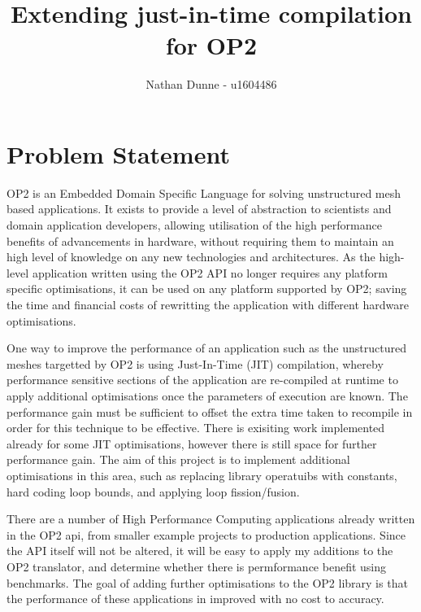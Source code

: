 \documentclass[11pt]{article}
\title{Extending just-in-time compilation for OP2}
\author{Nathan Dunne - u1604486}
\begin{document}
\maketitle
\section*{Problem Statement}
OP2 is an Embedded Domain Specific Language for solving unstructured mesh based applications. It exists to provide a level of abstraction to scientists and domain application developers, allowing utilisation of the high performance benefits of advancements in hardware, without requiring them to maintain an high level of knowledge on any new technologies and architectures. As the high-level application written using the OP2 API no longer requires any platform specific optimisations, it can be used on any platform supported by OP2; saving the time and financial costs of rewritting the application with different hardware optimisations.
\newline
\par
One way to improve the performance of an application such as the unstructured meshes targetted by OP2 is using Just-In-Time (JIT) compilation, whereby performance sensitive sections of the application are re-compiled at runtime to apply additional optimisations once the parameters of execution are known. The performance gain must be sufficient to offset the extra time taken to recompile in order for this technique to be effective. There is exisiting work implemented already for some JIT optimisations, however there is still space for further performance gain. The aim of this project is to implement additional optimisations in this area, such as replacing library operatuibs with constants, hard coding loop bounds, and applying loop fission/fusion.
\newline
\par
There are a number of High Performance Computing applications already written in the OP2 api, from smaller example projects to production applications. Since the API itself will not be altered, it will be easy to apply my additions to the OP2 translator, and determine whether there is permformance benefit using benchmarks. The goal of adding further optimisations to the OP2 library is that the performance of these applications in improved with no cost to accuracy.  
\end{document}
